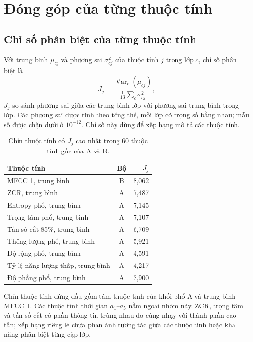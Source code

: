 \documentclass[11pt,a4paper]{article}
\begin{document}
\section{Đóng góp của từng thuộc tính}\label{sec:dongop}
\subsection{Chỉ số phân biệt của từng thuộc tính}
Với trung bình $\mu_{cj}$ và phương sai $\sigma^2_{cj}$ của thuộc tính $j$ trong lớp $c$, chỉ số phân biệt là
\[
J_j=\frac{\operatorname{Var}_{c}(\mu_{cj})}{\frac1{13}\sum_c\sigma^2_{cj}},
\]
$J_j$ so sánh phương sai giữa các trung bình lớp với phương sai trung bình trong lớp. Các phương sai được tính theo tổng thể, mỗi lớp có trọng số bằng nhau; mẫu số được chặn dưới ở $10^{-12}$. Chỉ số này dùng để xếp hạng mô tả các thuộc tính.
\begin{table}[H]
\centering\small
\caption{Chín thuộc tính có $J_j$ cao nhất trong 60 thuộc tính gốc của A và B.}\label{tab:J}
\begin{tabular}{lcr}
\toprule
Thuộc tính & Bộ & $J_j$\\\midrule
MFCC 1, trung bình & B & 8,062 \\
ZCR, trung bình & A & 7,487 \\
Entropy phổ, trung bình & A & 7,145 \\
Trọng tâm phổ, trung bình & A & 7,107 \\
Tần số cắt 85\%, trung bình & A & 6,709 \\
Thông lượng phổ, trung bình & A & 5,921 \\
Độ rộng phổ, trung bình & A & 4,591 \\
Tỷ lệ năng lượng thấp, trung bình & A & 4,217 \\
Độ phẳng phổ, trung bình & A & 3,900 \\
\bottomrule
\end{tabular}
\end{table}
Chín thuộc tính đứng đầu gồm tám thuộc tính của khối phổ A và trung bình MFCC 1. Các thuộc tính thời gian $a_1$--$a_5$ nằm ngoài nhóm này. ZCR, trọng tâm và tần số cắt có phần thông tin trùng nhau do cùng nhạy với thành phần cao tần; xếp hạng riêng lẻ chưa phản ánh tương tác giữa các thuộc tính hoặc khả năng phân biệt từng cặp lớp.
\end{document}
